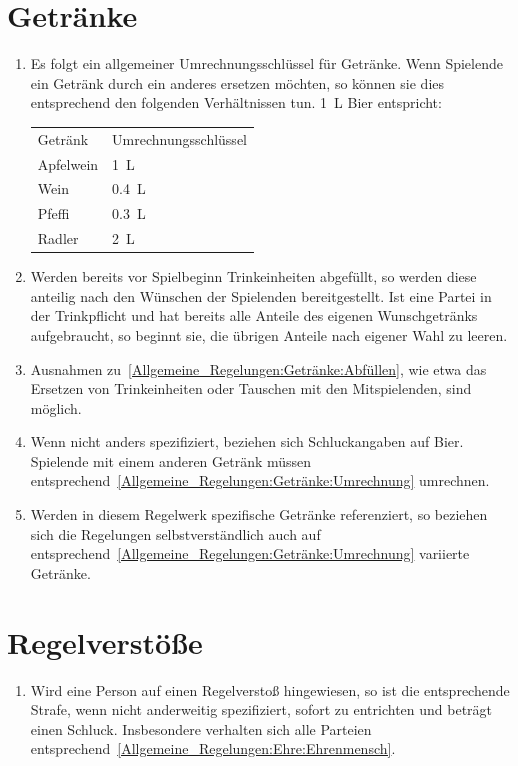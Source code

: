 \section{Getränke}\label{Allgemeine_Regelungen:Getränke}
\begin{enumerate}[label={(\arabic*)}]
	\item\label{Allgemeine_Regelungen:Getränke:Umrechnung}
	Es folgt ein allgemeiner Umrechnungsschlüssel für Getränke.
	Wenn Spielende ein Getränk durch ein anderes ersetzen möchten, so können sie dies entsprechend den folgenden Verhältnissen tun.
	\SI{1}{\liter} Bier entspricht:
	\begin{tabular}{ll}
		\toprule
		Getränk   & Umrechnungsschlüssel \\
		Apfelwein & \SI{1}{\liter} \\
		Wein 	  & \SI{0,4}{\liter} \\
		Pfeffi 	  & \SI{0,3}{\liter} \\
		Radler    & \SI{2}{\liter} \\
		\bottomrule
	\end{tabular}
	
	\item\label{Allgemeine_Regelungen:Getränke:Abfüllen}
	Werden bereits vor Spielbeginn Trinkeinheiten abgefüllt, so werden diese anteilig nach den Wünschen der Spielenden bereitgestellt.
	Ist eine Partei in der Trinkpflicht und hat bereits alle Anteile des eigenen Wunschgetränks aufgebraucht, so beginnt sie, die übrigen Anteile nach eigener Wahl zu leeren.
	
	\item
	Ausnahmen zu~\ref{Allgemeine_Regelungen:Getränke:Abfüllen}, wie etwa das Ersetzen von Trinkeinheiten oder Tauschen mit den Mitspielenden, sind möglich.
	
	\item
	Wenn nicht anders spezifiziert, beziehen sich Schluckangaben auf Bier.
	Spielende mit einem anderen Getränk müssen entsprechend~\ref{Allgemeine_Regelungen:Getränke:Umrechnung} umrechnen.

	\item
	Werden in diesem Regelwerk spezifische Getränke referenziert, so beziehen sich die Regelungen selbstverständlich auch auf entsprechend~\ref{Allgemeine_Regelungen:Getränke:Umrechnung} variierte Getränke.
\end{enumerate}

\section{Regelverstöße}
\begin{enumerate}[label={(\arabic*)}]
	\item 
	Wird eine Person auf einen Regelverstoß hingewiesen, so ist die entsprechende Strafe,
	wenn nicht anderweitig spezifiziert, sofort zu entrichten und beträgt einen Schluck.
	Insbesondere verhalten sich alle Parteien entsprechend~\ref{Allgemeine_Regelungen:Ehre:Ehrenmensch}.
\end{enumerate}
